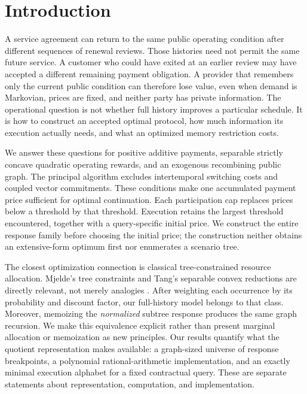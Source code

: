 \section{Introduction}\label{sec:introduction}
A service agreement can return to the same public operating condition after different sequences of renewal reviews. Those histories need not permit the same future service. A customer who could have exited at an earlier review may have accepted a different remaining payment obligation. A provider that remembers only the current public condition can therefore lose value, even when demand is Markovian, prices are fixed, and neither party has private information. The operational question is not whether full history improves a particular schedule. It is how to construct an accepted optimal protocol, how much information its execution actually needs, and what an optimized memory restriction costs.

We answer these questions for positive additive payments, separable strictly concave quadratic operating rewards, and an exogenous recombining public graph. The principal algorithm excludes intertemporal switching costs and coupled vector commitments. These conditions make one accumulated payment price sufficient for optimal continuation. Each participation cap replaces prices below a threshold by that threshold. Execution retains the largest threshold encountered, together with a query-specific initial price. We construct the entire response family before choosing the initial price; the construction neither obtains an extensive-form optimum first nor enumerates a scenario tree.

The closest optimization connection is classical tree-constrained resource allocation. Mjelde's tree constraints and Tang's separable convex reductions are directly relevant, not merely analogies \citep{Mjelde1983,Tang1990}. After weighting each occurrence by its probability and discount factor, our full-history model belongs to that class. Moreover, memoizing the \emph{normalized} subtree response produces the same graph recursion. We make this equivalence explicit rather than present marginal allocation or memoization as new principles. Our results quantify what the quotient representation makes available: a graph-sized universe of response breakpoints, a polynomial rational-arithmetic implementation, and an exactly minimal execution alphabet for a fixed contractual query. These are separate statements about representation, computation, and implementation.

